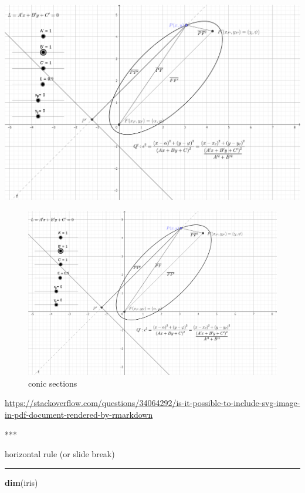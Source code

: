 \documentclass[
]{book}
\newenvironment{Shaded}{\begin{snugshade}}{\end{snugshade}}
\newcommand{\FunctionTok}[1]{\textcolor[rgb]{0.13,0.29,0.53}{\textbf{#1}}}
\newcommand{\NormalTok}[1]{#1}
\theoremstyle{definition}
\theoremstyle{definition}
\theoremstyle{definition}
\theoremstyle{definition}
\theoremstyle{remark}
\begin{document}
\includegraphics{img/conic-sections.pdf}

\begin{figure}
\includegraphics[width=0.75\linewidth]{img/conic-sections} \caption{conic sections}\label{fig:unnamed-chunk-6}
\end{figure}

\url{https://stackoverflow.com/questions/34064292/is-it-possible-to-include-svg-image-in-pdf-document-rendered-by-rmarkdown}

\begin{Shaded}
\begin{Highlighting}[]
\NormalTok{***}
\end{Highlighting}
\end{Shaded}

horizontal rule (or slide break)

\begin{center}\rule{0.5\linewidth}{0.5pt}\end{center}

\begin{Shaded}
\begin{Highlighting}[]
\FunctionTok{dim}\NormalTok{(iris) }
\end{Highlighting}
\end{Shaded}
\end{document}

